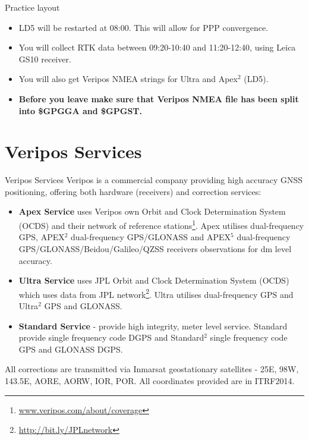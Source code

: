 \documentclass[11pt]{beamer}
\begin{document}
\begin{frame}{Practice layout}
	
	\begin{itemize}
		\item LD5 will be restarted at 08:00. This will allow for PPP convergence. 
		\item You will collect RTK data between 09:20-10:40 and 11:20-12:40, using Leica GS10 receiver. 
		\item You will also get Veripos NMEA strings for Ultra and Apex$^2$ (LD5).
		\item \textbf{Before you leave make sure that Veripos NMEA file has been split into \$GPGGA and \$GPGST.}
	\end{itemize}

\end{frame}


\section{Veripos Services}

\begin{frame}[allowframebreaks]{Veripos Services}
	Veripos is a commercial company providing high accuracy GNSS positioning, offering both hardware (receivers) and correction services:
	
	\begin{itemize}
		\item \textbf{Apex Service} uses Veripos own Orbit and Clock Determination System (OCDS) and their network of reference stations\footnote[frame]{\url{www.veripos.com/about/coverage}}. Apex utilises dual-frequency GPS, APEX$^2$ dual-frequency GPS/GLONASS and APEX$^5$  dual-frequency GPS/GLONASS/Beidou/Galileo/QZSS receivers observations for dm level accuracy.
		\item \textbf{Ultra Service} uses JPL Orbit and Clock Determination System (OCDS) which uses data from JPL network\footnote{\url{http://bit.ly/JPLnetwork}}. Ultra utilises dual-frequency GPS and Ultra$^2$ GPS and GLONASS.
		\item \textbf{Standard Service} - provide high integrity, meter level service. Standard provide single frequency code DGPS and Standard$^2$ single frequency code GPS and GLONASS DGPS.
	\end{itemize}
	All corrections are transmitted via Inmarsat geostationary satellites - 25E, 98W, 143.5E, AORE, AORW, IOR, POR. All coordinates provided are in ITRF2014.

\end{frame}
\end{document}
